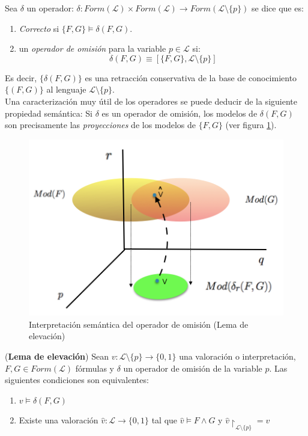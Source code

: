  Sea $\delta$ un operador: $\delta :Form(\mathcal{L}) \times Form(\mathcal{L}) \longrightarrow Form(\mathcal{L} \setminus \{ p \})$  se dice que es:

\begin{enumerate}
\item \textit{Correcto} si $\{F,G\} \vDash \delta (F,G)$.
\item un \textit{operador de omisión} para la variable $p \in \mathcal{L}$ si:
$$\delta (F,G) \equiv [\{F,G\}, \mathcal{L} \setminus \{p\}]$$
\end{enumerate} 

Es decir, $\{ \delta (F,G) \}$ es una retracción conservativa de la base de conocimiento $\{ (F,G) \}$ al lenguaje $\mathcal{L} \setminus \{ p \}$.\\

Una caracterización muy útil de los operadores se puede deducir de la siguiente propiedad semántica: Si  $\delta$ es un operador de omisión, los modelos de $\delta (F,G)$ son precisamente las \textit{proyecciones} de los modelos de $\{ F,G \}$ (ver figura \ref{fig:proy}). 

\begin{figure}[h]
	\centering
		\includegraphics[scale=0.6]{imagenes/indemod.png}
	\caption{Interpretación semántica del operador de omisión (Lema de elevación)}
	\label{fig:proy}
\end{figure}

\newpage
\lem \label{lem:lifting} (\textbf{Lema de elevación}) Sean $v :\mathcal{L} \setminus \{p\} \rightarrow \{ 0,1 \}$ una valoración o interpretación, $F, G \in Form(\mathcal{L})$ fórmulas y $\delta$ un operador de omisión de la variable $p$. Las siguientes condiciones son equivalentes:
\begin{enumerate}
\item $v \vDash \delta (F,G)$
\item Existe una valoración $\hat{v} : \mathcal{L} \rightarrow \{ 0,1 \}$ tal que $\hat{v} \vDash F \wedge G$ y $\hat{v} \upharpoonright_{\mathcal{L} \setminus \{ p \}} = v $
\end{enumerate}

